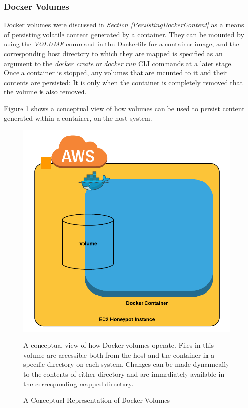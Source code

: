 
\subsubsection{Docker Volumes} \label{DockerVolumesExperimentation}
Docker volumes were discussed in \textit{Section \ref{PersistingDockerContent}} as a means of persisting volatile content generated by a container. They can be mounted by using the \textit{VOLUME} command in the Dockerfile for a container image, and the corresponding host directory to which they are mapped is specified as an argument to the \textit{docker create} or \textit{docker run} CLI commands at a later stage. Once a container is stopped, any volumes that are mounted to it and their contents are persisted: It is only when the container is completely removed that the volume is also removed.

Figure \ref{fig:DockerVolumes} shows a conceptual view of how volumes can be used to persist content generated within a container, on the host system. 

    \begin{figure}[ht]
      \centering
      \includegraphics[width=125mm, scale=1]{Images/Another_illustration_of_how_a_Docker_volume_looks.png}
      \caption{A Conceptual Representation of Docker Volumes} 
      \medskip
	  \small
		A conceptual view of how Docker volumes operate. Files in this volume are accessible both from the host and the container in a specific directory on each system. Changes can be made dynamically to the contents of either directory and are immediately available in the corresponding mapped directory. 
\label{fig:DockerVolumes}
\end{figure}

